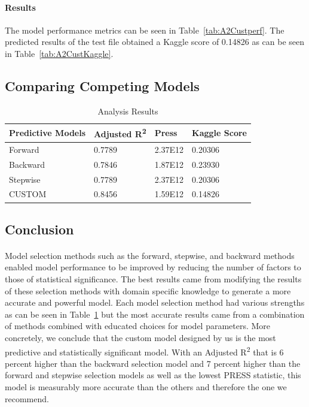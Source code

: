 \documentclass[11pt]{scrartcl} %
\begin{document}
\paragraph{Results} The model performance metrics can be seen in Table~\ref{tab:A2Custperf}. The predicted results of the test file obtained a Kaggle score of 0.14826 as can be seen in Table~\ref{tab:A2CustKaggle}.

\subsection{Comparing Competing Models}
\begin{table}[h] %
	\centering %
\begin{tabular}{|l|l|l|l|}
\hline
\textbf{Predictive Models} & \textbf{Adjusted R\textsuperscript{2}} & \textbf{Press} & \textbf{Kaggle Score}\\
\hline
Forward & 0.7789 & 2.37E12 & 0.20306\\
\hline
Backward & 0.7846 & 1.87E12 & 0.23930\\
\hline
Stepwise & 0.7789 & 2.37E12 & 0.20306\\
\hline
CUSTOM & 0.8456 & 1.59E12 & 0.14826\\
\hline
\end{tabular}
\caption{Analysis Results}
\label{tab:CCM}
\end{table}


\subsection{Conclusion}
\paragraph{} Model selection methods such as the forward, stepwise, and backward methods enabled model performance to be improved by reducing the number of factors to those of statistical significance.  The best results came from modifying the results of these selection methods with domain specific knowledge to generate a more accurate and powerful model. Each model selection method had various strengths as can be seen in Table~\ref{tab:CCM} but the most accurate results came from a combination of methods combined with educated choices for model parameters. More concretely, we conclude that the custom model designed by us is the most predictive and statistically significant model. With an Adjusted R\textsuperscript{2} that is 6 percent higher than the backward selection model and 7 percent higher than the forward and stepwise selection models as well as the lowest PRESS statistic, this model is measurably more accurate than the others and therefore the one we recommend.
\end{document}
